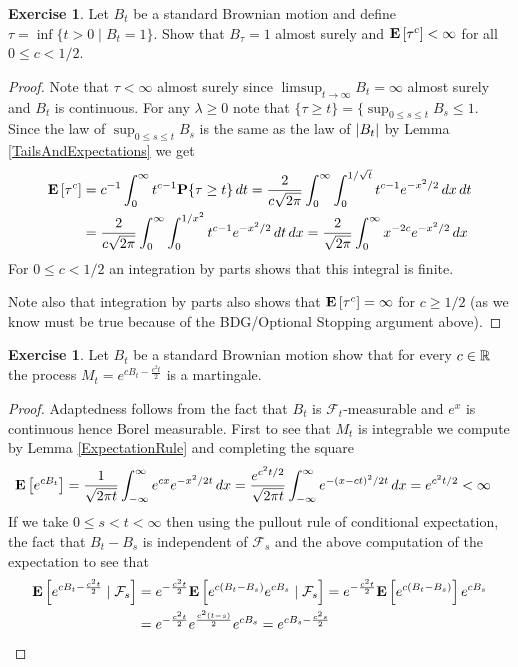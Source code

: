 \documentclass{amsart}
\theoremstyle{remark}
\theoremstyle{definition}
\newtheorem{ex}[thm]{Exercise}
\begin{document}
\begin{ex}Let $B_t$ be a standard Brownian motion and define $\tau =
  \inf \lbrace t > 0 \mid B_t = 1 \rbrace$.  Show that
  $B_\tau = 1$ almost surely and $\expectation{\tau^c} < \infty$ for
  all $0 \leq c < 1/2$.
\end{ex}
\begin{proof}
Note that $\tau < \infty$ almost surely since $\limsup_{t \to \infty}
B_t = \infty$ almost surely and $B_t$ is continuous.  For any $\lambda
\geq 0$ note that $ \lbrace \tau \geq t \rbrace = \lbrace
\sup_{0 \leq s \leq t} B_s \leq 1$.  Since the law of $\sup_{0 \leq s
  \leq t} B_s$ is the same as the law of $\abs{B_t}$ by Lemma
\ref{TailsAndExpectations} we get
\begin{align*}
\expectation{\tau^c} &= c^{-1} \int_0^\infty t^{c-1} \probability{\tau
  \geq t} \, dt = \frac{2}{c \sqrt{2\pi}} \int_0^\infty
\int_0^{1/\sqrt{t}}  t^{c-1} e^{-x^2/2} \, dx \, dt \\
&= \frac{2}{c \sqrt{2\pi}} \int_0^\infty
\int_0^{1/x^2}  t^{c-1} e^{-x^2/2} \, dt \, dx = \frac{2}{\sqrt{2\pi}}
\int_0^\infty x^{-2c} e^{-x^2/2} \, dx 
\end{align*}
For $0 \leq c < 1/2$ an integration by parts shows that this integral
is finite.

Note also that integration by parts also shows that
$\expectation{\tau^c} = \infty$ for $c \geq 1/2$ (as we know must be
true because of the BDG/Optional Stopping argument above).
\end{proof}

\begin{ex}Let $B_t$ be a standard Brownian motion show that for every
  $c \in \reals$ the process $M_t = e^{c B_t - \frac{c^2t}{2}}$ is a martingale.
\end{ex}
\begin{proof}
Adaptedness follows from the fact that $B_t$ is
$\mathcal{F}_t$-measurable and $e^x$ is continuous hence Borel
measurable.  First to see that $M_t$ is integrable we compute by Lemma
\ref{ExpectationRule} and completing the
square
\begin{align*}
\expectation{e^{cB_t}} &= \frac{1}{\sqrt{2\pi t}}
\int_{-\infty}^\infty e^{c x} e^{-x^2/2t} \, dx = \frac{ e^{c^2t/2}}{\sqrt{2\pi t}}
\int_{-\infty}^\infty e^{-(x-ct)^2/2t} \, dx = e^{c^2t/2} < \infty
\end{align*}
If we take $0 \leq s < t < \infty$ then using the pullout rule of
conditional expectation, the fact that $B_t -
B_s$ is independent of $\mathcal{F}_s$ and the above computation of
the expectation to see that
\begin{align*}
\cexpectationlong{\mathcal{F}_s}{e^{c B_t - \frac{c^2t}{2}}}
&=e^{- \frac{c^2t}{2}}\cexpectationlong{\mathcal{F}_s}{e^{c (B_t -B_s)} e^{cB_s} } 
= e^{- \frac{c^2t}{2}}\expectation{e^{c (B_t -B_s)}} e^{cB_s} \\
&= e^{- \frac{c^2t}{2} }e^{\frac{c^2(t-s)}{2}}  e^{cB_s} 
= e^{c B_s - \frac{c^2s}{2}}
\end{align*}
\end{proof}
\end{document}
